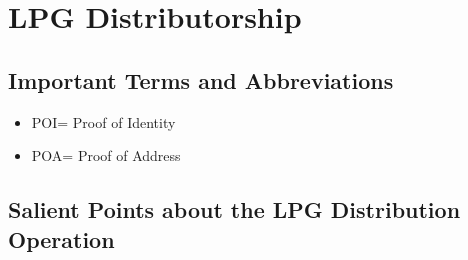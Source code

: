\documentclass{report}
\begin{document}
	\chapter{LPG Distributorship}
	\section{Important Terms and Abbreviations}
	\begin{itemize}
		\item POI= Proof of Identity
		\item POA= Proof of Address
	\end{itemize}
	\section{Salient Points about the LPG Distribution Operation}
\end{document}
